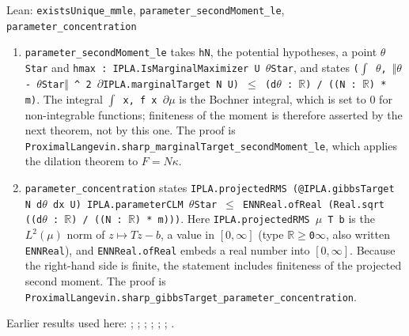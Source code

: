 \documentclass[11pt,a4paper]{article}
\begin{document}
\begin{leanbox}{Lean: \texttt{existsUnique\_\allowbreak{}mmle}, \texttt{parameter\_\allowbreak{}secondMoment\_\allowbreak{}le}, \texttt{parameter\_\allowbreak{}concentration}}
\begin{enumerate}
\item \texttt{parameter\_\allowbreak{}second\allowbreak{}Moment\_\allowbreak{}le} takes \texttt{h\allowbreak{}N}, the potential hypotheses, a point \texttt{\ensuremath{\theta}\allowbreak{}Star} and \texttt{hmax : IPLA.\allowbreak{}Is\allowbreak{}Marginal\allowbreak{}Maximizer U \ensuremath{\theta}\allowbreak{}Star}, and states \texttt{(\ensuremath{\int} \ensuremath{\theta}, \ensuremath{\Vert}\ensuremath{\theta} -\allowbreak{} \ensuremath{\theta}\allowbreak{}Star\ensuremath{\Vert} \textasciicircum{} 2 \ensuremath{\partial}IPLA.\allowbreak{}marginal\allowbreak{}Target N U) \ensuremath{\le} (d\ensuremath{\theta} : \ensuremath{\mathbb R}) /\allowbreak{} ((N : \ensuremath{\mathbb R}) * m)}. The integral \texttt{\ensuremath{\int} x, f x \ensuremath{\partial}\ensuremath{\mu}} is the Bochner integral, which is set to \(0\) for non-integrable functions; finiteness of the moment is therefore asserted by the next theorem, not by this one. The proof is \texttt{Proximal\allowbreak{}Langevin.\allowbreak{}sharp\_\allowbreak{}marginal\allowbreak{}Target\_\allowbreak{}second\allowbreak{}Moment\_\allowbreak{}le}, which applies the dilation theorem to \(F=N\kappa\).

\item \texttt{parameter\_\allowbreak{}concentration} states \texttt{IPLA.\allowbreak{}projected\allowbreak{}RMS (@IPLA.\allowbreak{}gibbs\allowbreak{}Target N d\ensuremath{\theta} dx U) IPLA.\allowbreak{}parameter\allowbreak{}CLM \ensuremath{\theta}\allowbreak{}Star \ensuremath{\le} ENNReal.\allowbreak{}of\allowbreak{}Real (Real.\allowbreak{}sqrt ((d\ensuremath{\theta} : \ensuremath{\mathbb R}) /\allowbreak{} ((N : \ensuremath{\mathbb R}) * m)))}. Here \texttt{IPLA.\allowbreak{}projected\allowbreak{}RMS \ensuremath{\mu} T b} is the \(L^2(\mu)\) norm of \(z\mapsto Tz-b\), a value in \([0,\infty]\) (type \texttt{\ensuremath{\mathbb R}\ensuremath{\ge}0\ensuremath{\infty}}, also written \texttt{ENNReal}), and \texttt{ENNReal.\allowbreak{}of\allowbreak{}Real} embeds a real number into \([0,\infty]\). Because the right-hand side is finite, the statement includes finiteness of the projected second moment. The proof is \texttt{Proximal\allowbreak{}Langevin.\allowbreak{}sharp\_\allowbreak{}gibbs\allowbreak{}Target\_\allowbreak{}parameter\_\allowbreak{}concentration}.

\end{enumerate}
\end{leanbox}


Earlier results used here: \cite[Section~3.1.1]{LangevinLean2026IPLA}; \cite[Section~3.1.6]{LangevinLean2026IPLA}; \cite[Section~3.12.4]{LangevinLean2026IPLA}; \cite[Section~3.3.1]{LangevinLean2026IPLA}; \cite[Section~3.3.2]{LangevinLean2026IPLA}; \cite[Section~3.9.9]{LangevinLean2026IPLA}; \cite[Section~3.6.1]{LangevinLean2026Proximal}.
\end{document}
